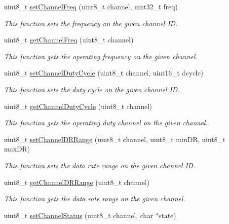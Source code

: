 \begin{DoxyCompactItemize}
uint8\+\_\+t \hyperlink{class_wasp_lo_ra_w_a_n_a735cc86e2f5b8a1eafdc52cd45374775}{set\+Channel\+Freq} (uint8\+\_\+t channel, uint32\+\_\+t freq)
\begin{DoxyCompactList}\small\item\em This function sets the frequency on the given channel ID. \end{DoxyCompactList}\item 
uint8\+\_\+t \hyperlink{class_wasp_lo_ra_w_a_n_abbe5f5d96028f9f4a06bbf2596152a5e}{get\+Channel\+Freq} (uint8\+\_\+t channel)
\begin{DoxyCompactList}\small\item\em This function gets the operating frequency on the given channel. \end{DoxyCompactList}\item 
uint8\+\_\+t \hyperlink{class_wasp_lo_ra_w_a_n_aec59f2e23ba9f70bc55a39d2b4c68da8}{set\+Channel\+Duty\+Cycle} (uint8\+\_\+t channel, uint16\+\_\+t dcycle)
\begin{DoxyCompactList}\small\item\em This function sets the duty cycle on the given channel ID. \end{DoxyCompactList}\item 
uint8\+\_\+t \hyperlink{class_wasp_lo_ra_w_a_n_a9d2ba71b7570269c9c46301bc4747c78}{get\+Channel\+Duty\+Cycle} (uint8\+\_\+t channel)
\begin{DoxyCompactList}\small\item\em This function gets the operating duty channel on the given channel. \end{DoxyCompactList}\item 
uint8\+\_\+t \hyperlink{class_wasp_lo_ra_w_a_n_a62affcaabcc35e4abe857570d0050231}{set\+Channel\+D\+R\+Range} (uint8\+\_\+t channel, uint8\+\_\+t min\+DR, uint8\+\_\+t max\+DR)
\begin{DoxyCompactList}\small\item\em This function sets the data rate range on the given channel ID. \end{DoxyCompactList}\item 
uint8\+\_\+t \hyperlink{class_wasp_lo_ra_w_a_n_add26dfe412e43476e4cd4be1ca7b6c9a}{get\+Channel\+D\+R\+Range} (uint8\+\_\+t channel)
\begin{DoxyCompactList}\small\item\em This function gets the data rate range on the given channel. \end{DoxyCompactList}\item 
uint8\+\_\+t \hyperlink{class_wasp_lo_ra_w_a_n_a482c198da0a459455315a81310110d81}{set\+Channel\+Status} (uint8\+\_\+t channel, char $\ast$state)

\end{DoxyCompactItemize}

